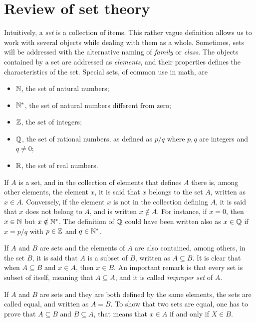 \chapter{Review of set theory}
\begin{flushright}
\end{flushright}


Intuitively, a \emph{set} is a collection of items. This rather vague definition allows us to work with several objects while dealing with them as a whole. Sometimes, sets will be addressed with the alternative naming of \emph{family} or \emph{class}. The objects contained by a set are addressed as \emph{elements}, and their properties defines the characteristics of the set. Special sets, of common use in math, are
\begin{itemize}
\item $\mathbb{ N}$, the set of natural numbers;
\item $\mathbb{ N}^{*}$, the set of natural numbers different from zero;
\item $\mathbb{ Z}$, the set of integers;
\item $\mathbb{ Q}$, the set of rational numbers, as defined as $p/q$ where $p,q$ are integers and $q \neq 0$;
\item $\mathbb{ R}$, the set of real numbers.
\end{itemize}

If $A$ is a set, and in the collection of elements that defines $A$ there is, among other elements, the element $x$, it is said that $x$ belongs to the set $A$, written as $x \in A$. Conversely, if the element $x$ is not in the collection defining $A$, it is said that $x$ does not belong to $A$, and is written $x \notin A$. For instance, if $x=0$, then $x \in \mathbb{ N}$ but $x \notin \mathbb{ N}^{*}$. The definition of $\mathbb{ Q}$ could have been written also as $x \in \mathbb{ Q}$ if $x=p/q$ with $p \in \mathbb{ Z}$ and $q \in \mathbb{ N}^{*}$.

If $A$ and $B$ are sets and the elements of $A$ are also contained, among others, in the set $B$, it is said that $A$ is a subset of $B$, written as $A \subseteq B$. It is clear that when $A \subseteq B$ and $x\in A$, then $x \in B$. An important remark is that every set is subset of itself, meaning that $A \subseteq A$, and it is called \emph{improper set} of $A$.

If $A$ and $B$ are sets and they are both defined by the same elements, the sets are called equal, and written as $A=B$. To show that two sets are equal, one has to prove that $A \subseteq B$ and $B \subseteq A$, that means that $x \in A$ if and only if $X \in B$. 

